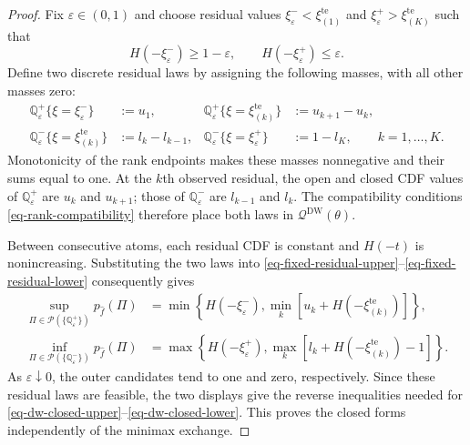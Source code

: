 \begin{proof}
  Fix $\varepsilon\in(0,1)$ and choose residual values $\xi^-_\varepsilon<\xi_{(1)}^{\mathrm{te}}$ and $\xi^+_\varepsilon>\xi_{(K)}^{\mathrm{te}}$ such that
  \[
    H\left(-\xi^-_\varepsilon\right)\ge1-\varepsilon,
    \qquad H\left(-\xi^+_\varepsilon\right)\le\varepsilon.
  \]
  Define two discrete residual laws by assigning the following masses, with all other masses zero:
  \begin{equation}
    \begin{aligned}
      \mathbb Q^+_\varepsilon\{\xi=\xi^-_\varepsilon\}&:=u_1,
      &\mathbb Q^+_\varepsilon\{\xi=\xi_{(k)}^{\mathrm{te}}\}&:=u_{k+1}-u_k,\\
      \mathbb Q^-_\varepsilon\{\xi=\xi_{(k)}^{\mathrm{te}}\}&:=l_k-l_{k-1},
      &\mathbb Q^-_\varepsilon\{\xi=\xi^+_\varepsilon\}&:=1-l_K,
      \qquad k=1,\ldots,K.
    \end{aligned}
    \label{eq-extremal-residual-laws}
  \end{equation}
  Monotonicity of the rank endpoints makes these masses nonnegative and their sums equal to one. At the $k$th observed residual, the open and closed CDF values of $\mathbb Q^+_\varepsilon$ are $u_k$ and $u_{k+1}$; those of $\mathbb Q^-_\varepsilon$ are $l_{k-1}$ and $l_k$. The compatibility conditions \eqref{eq-rank-compatibility} therefore place both laws in $\mathcal Q^{\mathrm{DW}}(\theta)$.

  Between consecutive atoms, each residual CDF is constant and $H(-t)$ is nonincreasing. Substituting the two laws into \eqref{eq-fixed-residual-upper}--\eqref{eq-fixed-residual-lower} consequently gives
  \begin{align}
    \sup_{\Pi\in\mathcal P(\{\mathbb Q^+_\varepsilon\})}p_{\hat f}(\Pi)
    &=\min\left\{H\left(-\xi^-_\varepsilon\right),
      \min_k\left[u_k+H\left(-\xi_{(k)}^{\mathrm{te}}\right)\right]\right\},
      \label{eq-upper-extremal-value}\\
    \inf_{\Pi\in\mathcal P(\{\mathbb Q^-_\varepsilon\})}p_{\hat f}(\Pi)
    &=\max\left\{H\left(-\xi^+_\varepsilon\right),
      \max_k\left[l_k+H\left(-\xi_{(k)}^{\mathrm{te}}\right)-1\right]\right\}.
      \label{eq-lower-extremal-value}
  \end{align}
  As $\varepsilon\downarrow0$, the outer candidates tend to one and zero, respectively. Since these residual laws are feasible, the two displays give the reverse inequalities needed for \eqref{eq-dw-closed-upper}--\eqref{eq-dw-closed-lower}. This proves the closed forms independently of the minimax exchange.


\end{proof}

